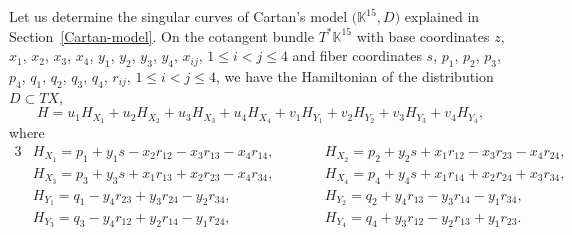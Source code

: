 \documentclass[pdftex]{sigma}
\numberwithin{equation}{section}
\theoremstyle{definition}
\newcommand{\KK}{\mathbb{K}}
\newcommand{\0}{\boldsymbol{0}}
\begin{document}
Let us determine the singular curves of Cartan's model $\bigl(\KK^{15}, D\bigr)$
explained in Section~\ref{Cartan-model}.
On the cotangent bundle $T^*\KK^{15}$ with base coordinates
$z$, $x_1$, $x_2$, $x_3$, $x_4$, $y_1$, $y_2$, $y_3$, $y_4$, $x_{ij}$, ${1 \leq i < j \leq 4}$ and
fiber coordinates
$s$, $p_1$, $p_2$, $p_3$, $p_4$, $q_1$, $q_2$, $q_3$, $q_4$, $r_{ij}$, $1 \leq i < j \leq 4$,
we have the Hamiltonian of the distribution $D \subset TX$,
\[
H = u_1H_{X_1} + u_2H_{X_2} + u_3H_{X_3} + u_4H_{X_4} + v_1H_{Y_1} + v_2H_{Y_2} + v_3H_{Y_3} + v_4H_{Y_4},
\]
where
\begin{alignat*}{3}
&H_{X_1} = p_1 + y_1s - x_2r_{12} - x_3r_{13} - x_4r_{14}, \qquad&&
H_{X_2} = p_2 + y_2s + x_1r_{12} - x_3r_{23} - x_4r_{24},&
\\
&H_{X_3} = p_3 + y_3s + x_1r_{13} + x_2r_{23} - x_4r_{34}, \qquad&&
H_{X_4} = p_4 + y_4s + x_1r_{14} + x_2r_{24} + x_3r_{34},&
\\
&H_{Y_1} = q_1 - y_4r_{23} + y_3r_{24} - y_2r_{34}, \qquad&&
H_{Y_2} = q_2 + y_4r_{13} - y_3r_{14} - y_1r_{34},&
\\
&H_{Y_3} = q_3 - y_4r_{12} + y_2r_{14} - y_1r_{24}, \qquad&&
H_{Y_4} = q_4 + y_3r_{12} - y_2r_{13} + y_1r_{23}.&
\end{alignat*}
\end{document}
